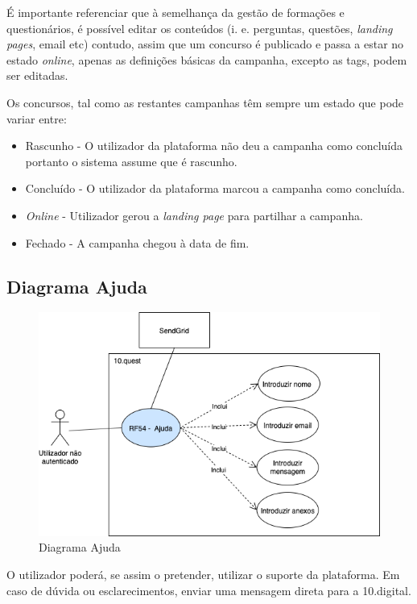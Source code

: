 É importante referenciar que à semelhança da gestão de formações e questionários, é possível editar os conteúdos (i. e. perguntas, questões, \textit{landing pages}, email etc) contudo, assim que um concurso é publicado e passa a estar no estado \textit{online}, apenas as definições básicas da campanha, excepto as tags, podem ser editadas. 

Os concursos, tal como as restantes campanhas têm sempre um estado que pode variar entre:
\begin{itemize}
	\item Rascunho - O utilizador da plataforma não deu a campanha como concluída portanto o sistema assume que é rascunho.
	\item Concluído - O utilizador da plataforma marcou a campanha como concluída.
	\item \textit{Online} - Utilizador gerou a \textit{landing page} para partilhar a campanha.
	\item Fechado - A campanha chegou à data de fim.
\end{itemize}


\subsection{Diagrama Ajuda}
\label{d:ajuda}
\begin{figure}[ht!]
	\begin{center}
		\includegraphics[width=1\textwidth]{img/rf/ajuda}
		\caption{Diagrama Ajuda}
		\label{fig:rf-ajuda}
	\end{center}
\end{figure}


O utilizador poderá, se assim o pretender, utilizar o suporte da plataforma. Em caso de dúvida ou esclarecimentos, enviar uma mensagem direta para a 10.digital. 

